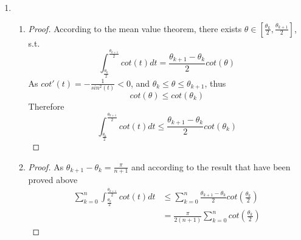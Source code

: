 \documentclass[paper=a4, fontsize=11pt]{scrartcl} %
\numberwithin{equation}{section} %
\numberwithin{figure}{section} %
\numberwithin{table}{section} %
\begin{document}
\begin{enumerate}
\begin{enumerate}
\begin{proof}
\begin{equation}
						\begin{aligned}
							\sum_{i=0}^{n}|l_i(1)| & = \sum_{i=0}^{n}\Bigg|\frac{T_{n+1}(1)}{(1-x_i)T'_{n+1}(x_i)}\Bigg| \\
												   & = \sum_{i=0}^{n} \frac{1}{\Big|(1-x_i)T'_{n+1}(x_i)\Big|}\\
												   & = \frac{1}{n+1} \sum_{i=0}^{n} \bigg|\frac{sin\theta_i}{(1-cos\theta_i)} \bigg|\\
												   & = \frac{1}{n+1} \sum_{i=0}^{n} \bigg|\frac{sin\theta_i}{2sin^2(\frac{\theta_i}{2})} \bigg|\\
												   & \geq  \frac{1}{n+1} \sum_{i=0}^{n} cot(\frac{\theta_i}{2})\\
						\end{aligned}
					\end{equation}
				\end{proof} 			
		\end{enumerate}
	\item 
		\begin{enumerate}
			\item 
				\begin{proof}
					According to the mean value theorem, there exists $\theta \in [\frac{\theta_k}{2}, \frac{\theta_{k+1}}{2}]$, s.t.
					\begin{equation}
						\int_{\frac{\theta_k}{2}}^{\frac{\theta_{k+1}}{2}} cot(t) dt = \frac{\theta_{k+1} - \theta_k}{2} cot(\theta)
					\end{equation}
					As $cot'(t) = -\frac{1}{sin^2(t)} < 0$, and $\theta_k \leq \theta \leq \theta_{k+1}$, thus
					\begin{equation}
						cot(\theta) \leq cot(\theta_k)
					\end{equation}
					Therefore
					\begin{equation}
						\int_{\frac{\theta_k}{2}}^{\frac{\theta_{k+1}}{2}} cot(t) dt \leq \frac{\theta_{k+1} - \theta_k}{2} cot(\theta_k)
					\end{equation}
				\end{proof}
			
			\item 
				\begin{proof}
					As $\theta_{k+1} - \theta_k = \frac{\pi}{n+1}$ and according to the result that have been proved above
					\begin{equation}
						\begin{aligned}
							\sum_{k=0}^{n} \int_{\frac{\theta_k}{2}}^{\frac{\theta_{k+1}}{2}} cot(t) dt 
							& \leq \sum_{k=0}^{n} \frac{\theta_{k+1} - \theta_k}{2}cot(\frac{\theta_k}{2})\\
							& = \frac{\pi}{2(n+1)} \sum_{k=0}^{n} cot(\frac{\theta_k}{2})
						\end{aligned}
					\end{equation}
				\end{proof}
			

\end{enumerate}
\end{enumerate}
\end{document}
